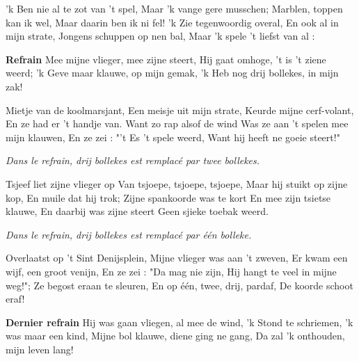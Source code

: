 \footnotemark [
ititle={Vliegerke ('T)}]


\beginverse
'k Ben nie al te zot van 't spel,
Maar 'k vange gere musschen;
Marblen, toppen kan ik wel,
Maar daarin ben ik ni fel!
'k Zie tegenwoordig overal,
En ook al in mijn strate,
Jongens schuppen op nen bal,
Maar 'k spele 't liefst van al :
\endverse

\beginchorus
\textbf{Refrain}
Mee mijne vlieger, mee zijne steert,
Hij gaat omhoge, 't is 't ziene weerd;
'k Geve maar klauwe, op mijn gemak,
'k Heb nog drij bollekes, in mijn zak!
\endchorus

\beginverse
Mietje van de koolmarsjant,
Een meisje uit mijn strate,
Keurde mijne cerf-volant,
En ze had er 't handje van.
Want zo rap alsof de wind
Was ze aan 't spelen mee mijn klauwen,
En ze zei : "'t Es 't spele weerd,
Want hij heeft ne goeie steert!"
\endverse

\emph{Dans le refrain, drij bollekes est remplacé par twee bollekes.}

\beginverse
Tsjeef liet zijne vlieger op
Van tsjoepe, tsjoepe, tsjoepe,
Maar hij stuikt op zijne kop,
En muile dat hij trok;
Zijne spankoorde was te kort
En mee zijn tsietse klauwe,
En daarbij was zijne steert
Geen sjieke toebak weerd.
\endverse

\emph{Dans le refrain, drij bollekes est remplacé par één bolleke.}

\beginverse
Overlaatst op 't Sint Denijsplein,
Mijne vlieger was aan 't zweven,
Er kwam een wijf, een groot venijn,
En ze zei : "Da mag nie zijn,
Hij hangt te veel in mijne weg!";
Ze begost eraan te sleuren,
En op één, twee, drij, pardaf,
De koorde schoot eraf!
\endverse

\beginchorus
\textbf{Dernier refrain}
Hij was gaan vliegen, al mee de wind,
'k Stond te schriemen, 'k was maar een kind,
Mijne bol klauwe, diene ging ne gang,
Da zal 'k onthouden, mijn leven lang!
\endchorus
\endsong
